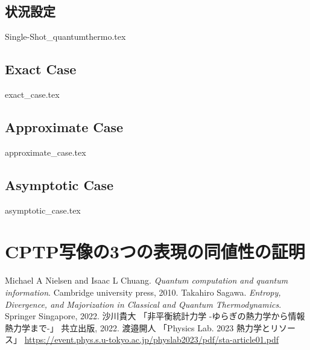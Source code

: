 \documentclass[report]{jlreq}
\begin{document}
\section{状況設定}\label{sec.Single-Shot_quantumthermo}
{Single-Shot_quantumthermo.tex}
\section{Exact Case}
{exact_case.tex}
\section{Approximate Case}
{approximate_case.tex}
\section{Asymptotic Case}
{asymptotic_case.tex}


\appendix
\chapter{CPTP写像の3つの表現の同値性の証明}
  
\begin{thebibliography}{99}
Michael A Nielsen and Isaac L Chuang. 
    \textit{Quantum computation and quantum information}.
    Cambridge university press, 2010.
Takahiro Sagawa. 
    \textit{Entropy, Divergence, and Majorization in Classical and Quantum Thermodynamics}. 
    Springer Singapore, 2022.
沙川貴大
    「非平衡統計力学 -ゆらぎの熱力学から情報熱力学まで-」
    共立出版, 2022. 
渡邉開人
    「Physics Lab. 2023 熱力学とリソース」
    \url{https://event.phys.s.u-tokyo.ac.jp/physlab2023/pdf/sta-article01.pdf}
\end{thebibliography}
  
\end{document}
